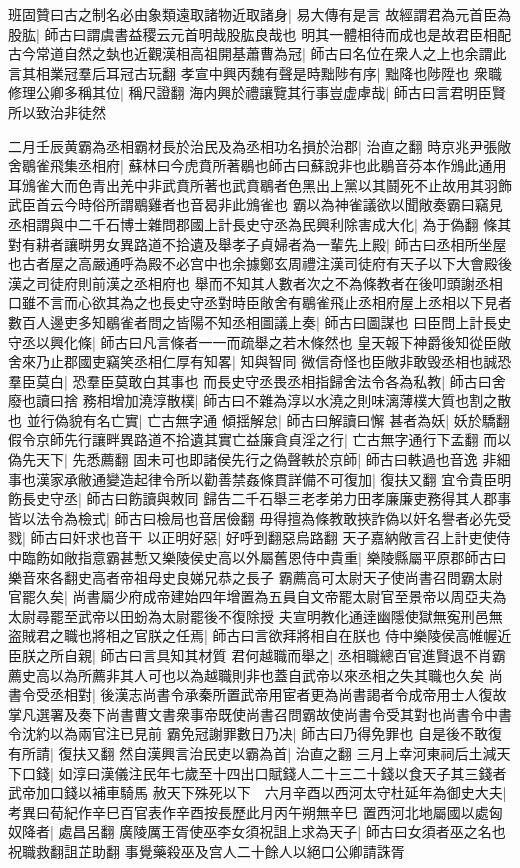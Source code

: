 班固贊曰古之制名必由象類遠取諸物近取諸身|{
	易大傳有是言}
故經謂君為元首臣為股肱|{
	師古曰謂虞書益稷云元首明哉股肱良哉也}
明其一體相待而成也是故君臣相配古今常道自然之埶也近觀漢相高祖開基蕭曹為冠|{
	師古曰名位在衆人之上也余謂此言其相業冠羣后耳冠古玩翻}
孝宣中興丙魏有聲是時黜陟有序|{
	黜降也陟陞也}
衆職修理公卿多稱其位|{
	稱尺證翻}
海内興於禮讓覽其行事豈虚虖哉|{
	師古曰言君明臣賢所以致治非徒然}


二月壬辰黄霸為丞相霸材長於治民及為丞相功名損於治郡|{
	治直之翻}
時京兆尹張敞舍鶡雀飛集丞相府|{
	蘇林曰今虎賁所著鶡也師古曰蘇說非也此鶡音芬本作鳻此通用耳鳻雀大而色青出羌中非武賁所著也武賁鶡者色黑出上黨以其鬪死不止故用其羽飾武臣首云今時俗所謂鶡雞者也音曷非此鳻雀也}
霸以為神雀議欲以聞敞奏霸曰竊見丞相謂與中二千石博士雜問郡國上計長史守丞為民興利除害成大化|{
	為于偽翻}
條其對有耕者讓畊男女異路道不拾遺及舉孝子貞婦者為一輩先上殿|{
	師古曰丞相所坐屋也古者屋之高嚴通呼為殿不必宫中也余據鄭玄周禮注漢司徒府有天子以下大會殿後漢之司徒府則前漢之丞相府也}
舉而不知其人數者次之不為條教者在後叩頭謝丞相口雖不言而心欲其為之也長史守丞對時臣敞舍有鶡雀飛止丞相府屋上丞相以下見者數百人邊吏多知鶡雀者問之皆陽不知丞相圖議上奏|{
	師古曰圖謀也}
曰臣問上計長史守丞以興化條|{
	師古曰凡言條者一一而疏舉之若木條然也}
皇天報下神爵後知從臣敞舍來乃止郡國吏竊笑丞相仁厚有知畧|{
	知與智同}
微信奇怪也臣敞非敢毁丞相也誠恐羣臣莫白|{
	恐羣臣莫敢白其事也}
而長史守丞畏丞相指歸舍法令各為私教|{
	師古曰舍廢也讀曰捨}
務相增加澆淳散樸|{
	師古曰不雜為淳以水澆之則味漓薄樸大質也割之散也}
並行偽貌有名亡實|{
	亡古無字通}
傾揺解怠|{
	師古曰解讀曰懈}
甚者為妖|{
	妖於驕翻}
假令京師先行讓畔異路道不拾遺其實亡益廉貪貞淫之行|{
	亡古無字通行下孟翻}
而以偽先天下|{
	先悉薦翻}
固未可也即諸侯先行之偽聲軼於京師|{
	師古曰軼過也音逸}
非細事也漢家承敝通變造起律令所以勸善禁姦條貫詳備不可復加|{
	復扶又翻}
宜令貴臣明飭長史守丞|{
	師古曰飭讀與敇同}
歸告二千石舉三老孝弟力田孝廉廉吏務得其人郡事皆以法令為檢式|{
	師古曰檢局也音居儉翻}
毋得擅為條教敢挾詐偽以奸名譽者必先受戮|{
	師古曰奸求也音干}
以正明好惡|{
	好呼到翻惡烏路翻}
天子嘉納敞言召上計吏使侍中臨飭如敞指意霸甚慙又樂陵侯史高以外屬舊恩侍中貴重|{
	樂陵縣屬平原郡師古曰樂音來各翻史高者帝祖母史良娣兄恭之長子}
霸薦高可太尉天子使尚書召問霸太尉官罷久矣|{
	尚書屬少府成帝建始四年增置為五員自文帝罷太尉官至景帝以周亞夫為太尉尋罷至武帝以田蚡為太尉罷後不復除授}
夫宣明教化通逹幽隱使獄無寃刑邑無盗賊君之職也將相之官朕之任焉|{
	師古曰言欲拜將相自在朕也}
侍中樂陵侯高帷幄近臣朕之所自親|{
	師古曰言具知其材質}
君何越職而舉之|{
	丞相職總百官進賢退不肖霸薦史高以為所薦非其人可也以為越職則非也蓋自武帝以來丞相之失其職也久矣}
尚書令受丞相對|{
	後漢志尚書令承秦所置武帝用宦者更為尚書謁者令成帝用士人復故掌凡選署及奏下尚書曹文書衆事帝既使尚書召問霸故使尚書令受其對也尚書令中書令沈約以為兩官注已見前}
霸免冠謝罪數日乃决|{
	師古曰乃得免罪也}
自是後不敢復有所請|{
	復扶又翻}
然自漢興言治民吏以霸為首|{
	治直之翻}
三月上幸河東祠后土減天下口錢|{
	如淳曰漢儀注民年七歲至十四出口賦錢人二十三二十錢以食天子其三錢者武帝加口錢以補車騎馬}
赦天下殊死以下　六月辛酉以西河太守杜延年為御史大夫|{
	考異曰荀紀作辛巳百官表作辛酉按長歷此月丙午朔無辛巳}
置西河北地屬國以處匈奴降者|{
	處昌呂翻}
廣陵厲王胥使巫李女須祝詛上求為天子|{
	師古曰女須者巫之名也祝職救翻詛芷助翻}
事覺藥殺巫及宫人二十餘人以絕口公卿請誅胥

